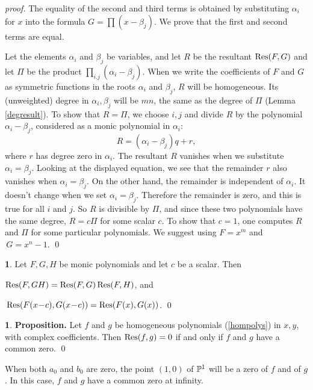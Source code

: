 \documentclass[leqno]{book}
\newcommand\Marginnote[1]{\marginnote{\hspace{-12pt}\normalfont{#1}}}
\theoremstyle{definition}%
\numberwithin{equation}{section}
\theoremstyle{theorem} %
\newtheorem{proposition}[equation]{}
\newtheorem{corollary}[equation]{}
\renewenvironment{proof}{\no \emph{proof.}}{}
\begin{document}
\begin{proof} 
The equality of the second and third terms is obtained by
substituting $\alpha_i$ for $x$ into the formula $G = \prod
(x-\beta_j)$.  We prove that the first and second terms are equal.

Let the elements $\alpha_i$ and $\beta_j$ be variables, and let $R$ be
the resultant $\operatorname{Res}(F,G)$ and let $\Pi$ be the product
$\prod_{i.j}(\alpha_i-\beta_j)$.  When we write the coefficients of
$F$ and $G$ as symmetric functions in the roots $\alpha_i$ and
$\beta_j$, $R$ will be homogeneous.  Its (unweighted) degree in
$\alpha_i,\beta_j$ will be $mn$, the same as the degree of $\Pi$
(Lemma \ref{degresult}). To show that $R = \Pi$, we choose $i,j$ and
divide $R$ by the polynomial $\alpha_i-\beta_j$, considered as a monic
polynomial in $\alpha_i$:
$$R = (\alpha_i-\beta_j)q + r,$$ where $r$ has degree zero in
$\alpha_i$.  The resultant $R$ vanishes when we substitute $\alpha_i =
\beta_j$.  Looking at the displayed equation, we see that the
remainder $r$ also vanishes when $\alpha_i = \beta_j$.  On the other
hand, the remainder is independent of $\alpha_i$.   It doesn't change
when we set $\alpha_i = \beta_j$.  Therefore the remainder is zero, and
this is true for all $i$ and $j$.  So $R$ is divisible by $\Pi$, and
since these two polynomials have the same degree, $R = c\Pi$ for some
scalar $c$.  To show that $c=1$, one computes $R$ and $\Pi$ for some
particular polynomials.  We suggest using $F = x^m$ and $\,G = x^n-1$.
\qed\end{proof}

\begin{corollary}{}
\label{restrivialities} Let $F,G,H$ be monic
polynomials and let $c$ be a scalar.  Then

   \; $\operatorname{Res}(F,GH) = \operatorname{Res}(F,G)\operatorname{Res}(F,H)$, \; and 

 \; $\,\operatorname{Res}(F(x\!-\!c),G(x\!-\!c)) =
\operatorname{Res}(F(x),G(x))$.
\qed\end{corollary}

\begin{proposition}{\bf Proposition.}
\Marginnote{leadcoeffnotzero}\label{leadcoeffnotzero} Let $f$ and $g$
be homogeneous polynomials (\ref{hompolys}) in $x,y$, with complex
coefficients.  Then $\operatorname{Res}(f,g) =0$ if and only if $f$ and $g$
have a common zero.  \qed
\end{proposition}

\no When both $a_0$ and $b_0$ are zero, the point $(1,0)$ of $\mathbb{P}^1$
will be a zero of $f$ and of $g$.  In this case, $f$ and $g$ have a
common zero at infinity.
\end{document}
